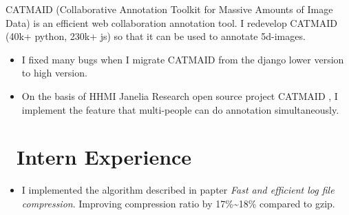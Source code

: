 \documentclass{resume}
\begin{document}
CATMAID (Collaborative Annotation Toolkit for Massive Amounts of Image Data) is an efficient web collaboration annotation tool. I redevelop CATMAID (40k+ python, 230k+ js) so that it can be used to annotate 5d-images.%
\begin{itemize}
  \item I fixed many bugs when I migrate CATMAID from the django lower version to high version.
  \item On the basis of HHMI Janelia Research open source project CATMAID , I implement the feature that multi-people can do annotation simultaneously.
\end{itemize}

\section{\faSitemap\ Intern Experience}

\begin{itemize}
    \item I implemented the algorithm described in papter \emph{Fast and efficient log file compression}. Improving compression ratio by 17\%\textasciitilde18\% compared to gzip.
\end{itemize}
\end{document}
